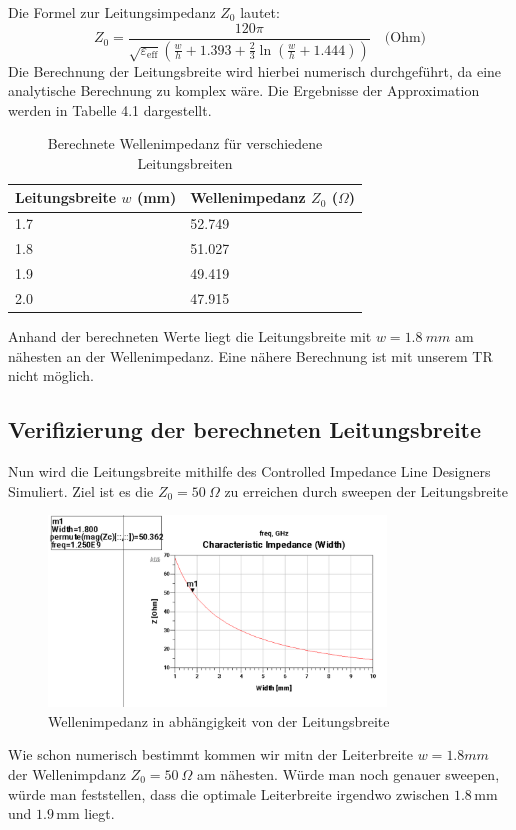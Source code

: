 Die Formel zur Leitungsimpedanz $Z_0$ lautet:
\begin{equation}
Z_0 = \frac{120 \pi}{\sqrt{\varepsilon_{\text{eff}}} \left( \frac{w}{h} + 1.393 + \frac{2}{3} \ln\left( \frac{w}{h} + 1.444 \right) \right)} \quad \text{(Ohm)}
\end{equation}
Die Berechnung der Leitungsbreite wird hierbei numerisch durchgeführt, da eine analytische Berechnung zu
komplex wäre. Die Ergebnisse der Approximation werden in Tabelle 4.1 dargestellt. \\
    
    \begin{table}[H]
        \centering
        \begin{tabular}{|l|l|}
            \hline
            \textbf{Leitungsbreite $w$ (mm)} & \textbf{Wellenimpedanz $Z_0$ ($\Omega$)} \\
            \hline
            1.7 & 52.749 \\
            1.8 & 51.027 \\
            1.9 & 49.419 \\
            2.0 & 47.915 \\
           
            \hline
        \end{tabular}
        \caption{Berechnete Wellenimpedanz für verschiedene Leitungsbreiten}
    \end{table}
    Anhand der berechneten Werte liegt die Leitungsbreite mit $w = 1.8~mm$ am nähesten an der Wellenimpedanz.
    Eine nähere Berechnung ist mit unserem TR nicht möglich. 

       

    \subsection{Verifizierung der berechneten Leitungsbreite}
    Nun wird die Leitungsbreite mithilfe des Controlled Impedance Line Designers Simuliert.
    Ziel ist es die $Z_0 = 50~\Omega$ zu erreichen durch sweepen der Leitungsbreite
    \begin{figure}[H]
        \centering
        \includegraphics[width=0.8\textwidth]{Pictures/LeitungsbreitenSweep.png}
        \caption{Wellenimpedanz in abhängigkeit von der Leitungsbreite}
    \end{figure}
    Wie schon numerisch bestimmt kommen wir mitn der Leiterbreite $w=1.8mm$ der Wellenimpdanz $Z_0 = 50~\Omega$
    am nähesten. Würde man noch genauer sweepen, würde man feststellen, dass die optimale Leiterbreite irgendwo zwischen
    $1.8\,\mathrm{mm}$ und $1.9\,\mathrm{mm}$ liegt.

